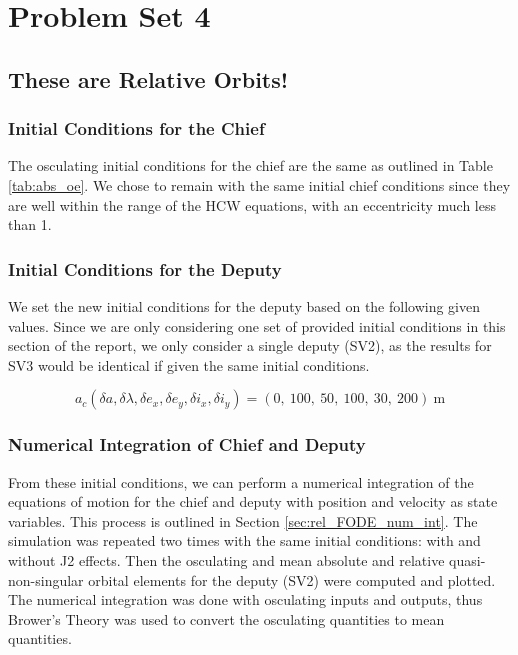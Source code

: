 \section{Problem Set 4}
\subsection{These are Relative Orbits!}

\subsubsection{Initial Conditions for the Chief} 
The osculating initial conditions for the chief are the same as outlined in Table \ref{tab:abs_oe}. We chose to remain with the same initial chief conditions since they are well within the range of the HCW equations, with an eccentricity much less than 1. 

\subsubsection{Initial Conditions for the Deputy} \label{sec:ic_for_pset4}

We set the new initial conditions for the deputy based on the following given values. Since we are only considering one set of provided initial conditions in this section of the report, we only consider a single deputy (SV2), as the results for SV3 would be identical if given the same initial conditions.

\[
a_c (\delta a, \delta \lambda, \delta e_x, \delta e_y, \delta i_x, \delta i_y) = (0,\ 100,\ 50,\ 100,\ 30,\ 200)~\text{m}
\]

\subsubsection{Numerical Integration of Chief and Deputy}
From these initial conditions, we can perform a numerical integration of the equations of motion for the chief and deputy with position and velocity as state variables. This process is outlined in Section \ref{sec:rel_FODE_num_int}. The simulation was repeated two times with the same initial conditions: with and without J2 effects. Then the osculating and mean absolute and relative quasi-non-singular orbital elements for the deputy (SV2) were computed and plotted. The numerical integration was done with osculating inputs and outputs, thus Brower's Theory was used to convert the osculating quantities to mean quantities. 

